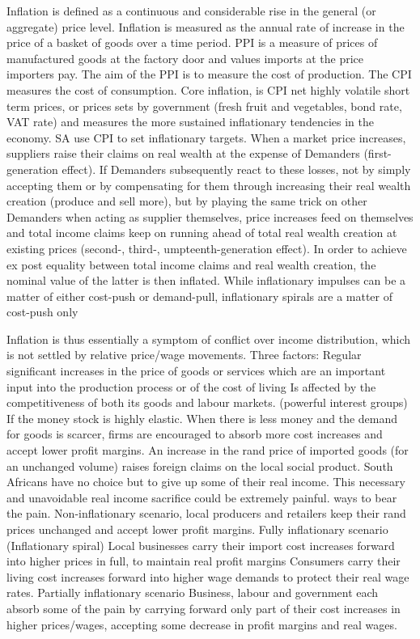 \documentclass[12pt]{examnotes}
\begin{document}
\ra Inflation is defined as a continuous and considerable rise in the general (or aggregate) price level.
\ra Inflation is measured as the annual rate of increase in the price of a basket of goods over a time period.
\ra PPI is a measure of prices of manufactured goods at the factory door and values imports at the price importers pay. The aim of the PPI is to measure the cost of production.
\ra The CPI measures the cost of consumption.
\ra Core inflation, is CPI net highly volatile short term prices, or prices sets by government (fresh fruit and vegetables, bond rate, VAT rate) and measures the more sustained inflationary tendencies in the economy.
\ra SA use CPI to set inflationary  targets.
\ra When a market price increases, suppliers raise their claims on real wealth at the expense of Demanders (first-generation effect). 
\ra If Demanders subsequently react to these losses, not by simply accepting them or by compensating for them through increasing their real wealth creation (produce and sell more), but by playing the same trick on other Demanders when acting as supplier themselves, price increases feed on themselves and total income claims keep on running ahead of total real wealth creation at existing prices (second-, third-, umpteenth-generation effect). In order to achieve ex post equality between total income claims and real wealth creation, the nominal value of the latter is then inflated.
\ra While inflationary impulses can be a matter of either cost-push or demand-pull, inflationary spirals are a matter of cost-push only

\ra Inflation is thus essentially a symptom of conflict over income distribution, which is not settled by relative price/wage movements. 
\ra Three factors:
 Regular significant increases in the price of goods or services which are an important input into the production process or of the cost of living
 Is affected by the competitiveness of both its goods and labour markets. (powerful interest groups)
 If the money stock is highly elastic. When there is less money and the demand for goods is scarcer, firms are encouraged to absorb more cost increases and accept lower profit margins.
 An increase in the rand price of imported goods (for an unchanged volume) raises foreign claims on the local social product. South Africans have no choice but to give up some of their real income. This necessary and unavoidable real income sacrifice could be extremely painful.
 ways to bear the pain.
 Non-inflationary scenario,
\rna local producers and retailers keep their rand prices unchanged and accept lower profit margins.
 Fully inflationary scenario (Inflationary spiral)
\rna Local businesses carry their import cost increases forward into higher prices in full, to maintain real profit margins
\rna Consumers carry their living cost increases forward into higher wage demands to protect their real wage rates.
 Partially inflationary scenario
\rna Business, labour and government each absorb some of the pain by carrying forward only part of their cost increases in higher prices/wages, accepting some decrease in profit margins and real wages.
\end{document}
